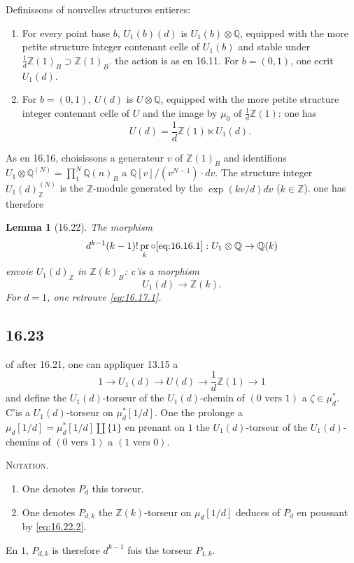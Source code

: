 \documentclass[12pt,a4paper]{article}
\theoremstyle{plain}
\newtheorem{lemma}[theorem]{Lemma}
\theoremstyle{definition}
\theoremstyle{remark}
\DeclareMathOperator{\pr}{pr}
\newcommand{\Betti}{B}
\newcommand{\ZZ}{\mathbb{Z}}
\newcommand{\QQ}{\mathbb{Q}}
\begin{document}
Definissons of nouvelles structures entieres:
\begin{enumerate}
\item[(a)] For every point base $b$, $U_1(b)(d)$ is $U_1(b) \otimes \QQ$,
equipped with the more petite structure integer contenant celle of $U_1(b)$
and stable under $\frac{1}{d}\ZZ(1)_\Betti \supset \ZZ(1)_\Betti$. the action
is as en 16.11. For $b = (0,1)$, one ecrit $U_1(d)$.
\item[(b)] For $b = (0,1)$, $U(d)$ is $U \otimes \QQ$, equipped with the more
petite structure integer contenant celle of $U$ and the image by
$\mu_0$ of $\frac{1}{d}\ZZ(1)$: one has
\begin{equation}\label{eq:16.21.1}
U(d) = \frac{1}{d}\ZZ(1) \ltimes U_1(d).
\end{equation}
\end{enumerate}

As en 16.16, choisissons a generateur $v$ of $\ZZ(1)_\Betti$ and
identifions $U_1 \otimes \QQ^{(N)} = \prod_1^N \QQ(n)_\Betti$ a
$\QQ[v]/(v^{N-1}) \cdot dv$. The structure integer
$U_1(d)_\ZZ^{(N)}$ is the $\ZZ$-module generated by the
$\exp(kv/d)dv$ ($k \in \ZZ$). one has therefore

\begin{lemma}[16.22]\label{lem:16.22}
The morphism
\begin{equation}\label{eq:16.22.1}
d^{k-1}(k-1)! \pr_k \circ \text{\eqref{eq:16.16.1}} : U_1 \otimes \QQ \to \QQ(k)
\end{equation}
envoie $U_1(d)_\ZZ$ in $\ZZ(k)_\Betti$: c'is a morphism
\begin{equation}\label{eq:16.22.2}
U_1(d) \to \ZZ(k).
\end{equation}
For $d=1$, one retrouve \eqref{eq:16.17.1}.
\end{lemma}

\subsection*{16.23}

of after 16.21, one can appliquer 13.15 a
\[
1 \to U_1(d) \to U(d) \to \frac{1}{d}\ZZ(1) \to 1
\]
and define the $U_1(d)$-torseur of the $U_1(d)$-chemin of
$(0 \text{ vers } 1)$ a $\zeta \in \mu_d^*$. C'is a $U_1(d)$-torseur
on $\mu_d^*[1/d]$. One the prolonge a
$\mu_d[1/d] = \mu_d^*[1/d] \amalg \{1\}$ en prenant on $1$ the
$U_1(d)$-torseur of the $U_1(d)$-chemins of $(0 \text{ vers } 1)$ a
$(1 \text{ vers } 0)$.

\noindent \textsc{Notation.}
\begin{enumerate}
\item[(i)] One denotes $P_d$ this torseur.
\item[(ii)] One denotes $P_{d,k}$ the $\ZZ(k)$-torseur on $\mu_d[1/d]$
deduces of $P_d$ en poussant by \eqref{eq:16.22.2}.
\end{enumerate}
En $1$, $P_{d,k}$ is therefore $d^{k-1}$ fois the torseur $P_{1,k}$.
\end{document}

